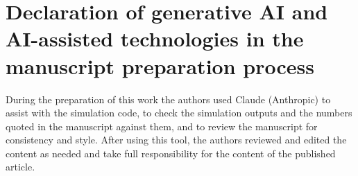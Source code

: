 \documentclass[review,number]{elsarticle}
\begin{document}
\section*{Declaration of generative AI and AI-assisted technologies in the manuscript preparation process}
During the preparation of this work the authors used Claude (Anthropic) to assist with the simulation code, to check the simulation outputs and the numbers quoted in the manuscript against them, and to review the manuscript for consistency and style. After using this tool, the authors reviewed and edited the content as needed and take full responsibility for the content of the published article.



\end{document}
